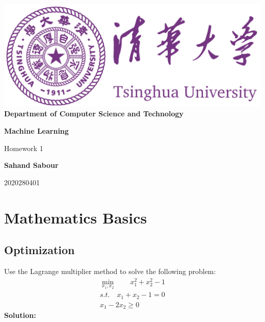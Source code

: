 \documentclass[12pt,a4paper]{article}
\begin{document}
	\begin{titlepage}
		\begin{center}
			\includegraphics[scale=.4]{Figures/Cover}\\
			\vspace{1cm}
			\bf{ \large {Department of Computer Science and Technology} }
		\end{center}
		
		\vspace{4cm}
		\centering
		\textbf{\Huge Machine Learning}
		\vspace{.5cm}
		
		{\Large Homework 1}

		\vspace{4cm}
		
		\textbf{\LARGE Sahand Sabour}
		
		
		
		\vspace{0.5cm}
		
		{\large 2020280401}
		
		
		\vfill
		
	\end{titlepage}

	\section{Mathematics Basics}
	\subsection{Optimization}
	Use the Lagrange multiplier method to solve the following problem:
	\begin{align*}
		\underset{x_1, x_2}{\min} \qquad  x_1^2 +x_2^2-1 \\
		s.t. \quad x_1 +x_2-1=0 \\
		x_1-2x_2\geq 0
	\end{align*}
	\noindent \textbf{Solution:}
	\vspace{0.2cm}
	
\end{document}

